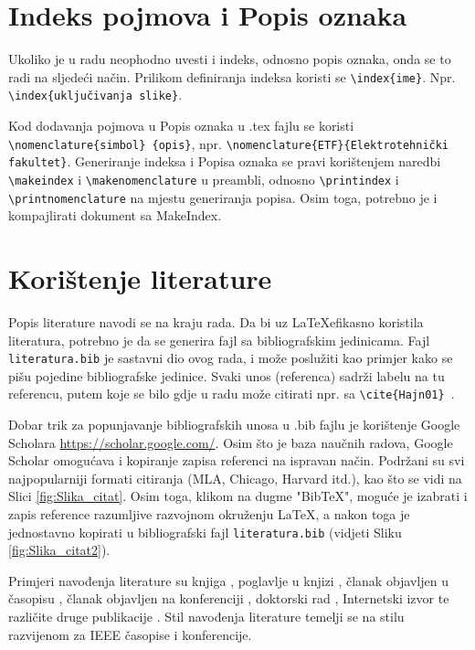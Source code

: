 \section{Indeks pojmova i Popis oznaka}

Ukoliko je u radu neophodno uvesti i indeks, odnosno popis oznaka, onda se to radi na sljedeći način. Prilikom definiranja indeksa koristi se {\tt \textbackslash index\{ime\}}. Npr. {\tt \textbackslash index\{uključivanja slike\}}. 

Kod dodavanja pojmova u Popis oznaka u .tex fajlu se koristi {\tt \textbackslash nomenclature\{simbol\} \{opis\}}, npr. {\tt \textbackslash nomenclature\{ETF\}\{Elektrotehnički fakultet\}}.
Generiranje indeksa i Popisa oznaka se pravi korištenjem naredbi {\tt \textbackslash makeindex} i {\tt \textbackslash makenomenclature} u preambli, odnosno {\tt \textbackslash printindex} i {\tt \textbackslash printnomenclature} na mjestu generiranja popisa. 
Osim toga, potrebno je i kompajlirati dokument sa MakeIndex. 




\section{Korištenje literature}

Popis literature navodi se na kraju rada. Da bi uz \LaTeX  efikasno koristila literatura, potrebno je da se generira fajl sa bibliografskim jedinicama. Fajl {\tt literatura.bib} je sastavni dio ovog rada, i može poslužiti kao primjer kako se pišu pojedine bibliografske jedinice. Svaki unos (referenca) sadrži labelu na tu referencu, putem koje se bilo gdje u radu može citirati npr. sa {\tt \textbackslash cite\{Hajn01\} }. 

Dobar trik za popunjavanje bibliografskih unosa u .bib fajlu je korištenje Google Scholara \url{https://scholar.google.com/}. Osim što je baza naučnih radova, Google Scholar omogućava i kopiranje zapisa referenci na ispravan način. Podržani su svi najpopularniji formati citiranja (MLA, Chicago, Harvard itd.), kao što se vidi na Slici \ref{fig:Slika_citat}. Osim toga, klikom na dugme "BibTeX", moguće je izabrati i zapis reference razumljive razvojnom okruženju \LaTeX, a nakon toga je jednostavno kopirati u bibliografski fajl  {\tt literatura.bib} (vidjeti Sliku \ref{fig:Slika_citat2}).

Primjeri navođenja literature su knjiga \cite{Hajn01}, poglavlje u knjizi \cite{Samp05}, članak objavljen u časopisu \cite{Sim03}, članak objavljen na konferenciji \cite{Wirt99}, doktorski rad \cite{Will93}, Internetski izvor \cite{Jone12} te različite druge publikacije \cite{Rsoft}. Stil navođenja literature temelji se na stilu razvijenom za IEEE časopise i konferencije.

